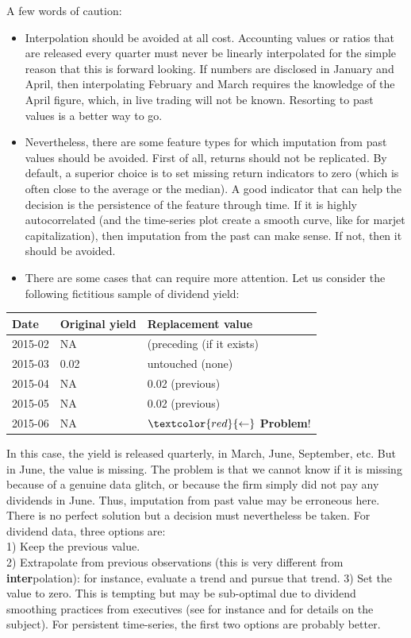 \documentclass[]{krantz}
\providecommand{\tightlist}{%
  \setlength{\itemsep}{0pt}\setlength{\parskip}{0pt}}
\theoremstyle{definition}
\theoremstyle{definition}
\theoremstyle{definition}
\theoremstyle{remark}
\begin{document}
A few words of caution:

\begin{itemize}
\tightlist
\item
  Interpolation should be avoided at all cost. Accounting values or
  ratios that are released every quarter must never be linearly
  interpolated for the simple reason that this is forward looking. If
  numbers are disclosed in January and April, then interpolating
  February and March requires the knowledge of the April figure, which,
  in live trading will not be known. Resorting to past values is a
  better way to go.\\
\item
  Nevertheless, there are some feature types for which imputation from
  past values should be avoided. First of all, returns should not be
  replicated. By default, a superior choice is to set missing return
  indicators to zero (which is often close to the average or the
  median). A good indicator that can help the decision is the
  persistence of the feature through time. If it is highly
  autocorrelated (and the time-series plot create a smooth curve, like
  for marjet capitalization), then imputation from the past can make
  sense. If not, then it should be avoided.\\
\item
  There are some cases that can require more attention. Let us consider
  the following fictitious sample of dividend yield:
\end{itemize}

\begin{longtable}[]{@{}lll@{}}
\toprule
Date & Original yield & Replacement value\tabularnewline
\midrule
\endhead
2015-02 & NA & (preceding (if it exists)\tabularnewline
2015-03 & 0.02 & untouched (none)\tabularnewline
2015-04 & NA & 0.02 (previous)\tabularnewline
2015-05 & NA & 0.02 (previous)\tabularnewline
2015-06 & NA & \(\textcolor{red}{\leftarrow}\)
\textbf{Problem}!\tabularnewline
\bottomrule
\end{longtable}

In this case, the yield is released quarterly, in March, June,
September, etc. But in June, the value is missing. The problem is that
we cannot know if it is missing because of a genuine data glitch, or
because the firm simply did not pay any dividends in June. Thus,
imputation from past value may be erroneous here. There is no perfect
solution but a decision must nevertheless be taken. For dividend data,
three options are:\\
1) Keep the previous value.\\
2) Extrapolate from previous observations (this is very different from
\textbf{inter}polation): for instance, evaluate a trend and pursue that
trend. 3) Set the value to zero. This is tempting but may be sub-optimal
due to dividend smoothing practices from executives (see for instance
\citet{leary2011determinants} and \citet{chen2012dividend} for details
on the subject). For persistent time-series, the first two options are
probably better.
\end{document}
